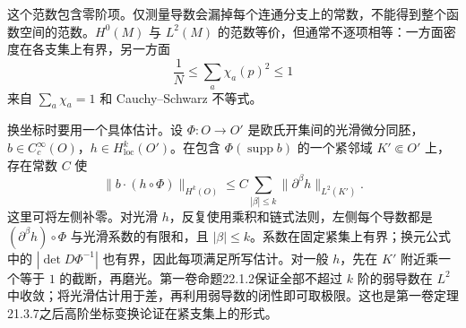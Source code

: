 这个范数包含零阶项。仅测量导数会漏掉每个连通分支上的常数，不能得到整个函数空间的范数。\(H^0(M)\) 与 \(L^2(M)\) 的范数等价，但通常不逐项相等：一方面密度在各支集上有界，另一方面
\[
 \frac1N\leq\sum_a\chi_a(p)^2\leq1
\]
来自 \(\sum_a\chi_a=1\) 和 Cauchy--Schwarz 不等式。

换坐标时要用一个具体估计。设 \(\Phi:O\to O'\) 是欧氏开集间的光滑微分同胚，\(b\in C_c^\infty(O)\)，\(h\in H^k_{\mathrm{loc}}(O')\)。在包含 \(\Phi(\operatorname{supp}b)\) 的一个紧邻域 \(K'\Subset O'\) 上，存在常数 \(C\) 使
\begin{equation}\label{b2:eq:28-coordinate-transfer}
 \|b\cdot(h\circ\Phi)\|_{H^k(O)}
 \leq C\sum_{|\beta|\leq k}\|\partial^\beta h\|_{L^2(K')}.
\end{equation}
这里可将左侧补零。对光滑 \(h\)，反复使用乘积和链式法则，左侧每个导数都是 \((\partial^\beta h)\circ\Phi\) 与光滑系数的有限和，且 \(|\beta|\leq k\)。系数在固定紧集上有界；换元公式中的 \(|\det D\Phi^{-1}|\) 也有界，因此每项满足所写估计。对一般 \(h\)，先在 \(K'\) 附近乘一个等于 \(1\) 的截断，再磨光。第一卷命题22.1.2保证全部不超过 \(k\) 阶的弱导数在 \(L^2\) 中收敛；将光滑估计用于差，再利用弱导数的闭性即可取极限。这也是第一卷定理21.3.7之后高阶坐标变换论证在紧支集上的形式。


